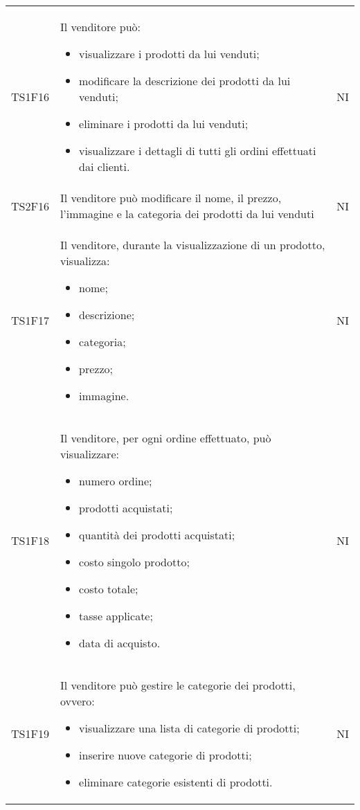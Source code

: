 {\begin{longtable}{C{3cm} C{10.2cm} C{1.5cm}}
TS1F16 & Il venditore può:
\begin{itemize}
	\item visualizzare i prodotti da lui venduti;
	\item modificare la descrizione dei prodotti da lui venduti;
	\item eliminare i prodotti da lui venduti;
	\item visualizzare i dettagli di tutti gli ordini effettuati dai clienti.
\end{itemize} & NI\\

TS2F16 & Il venditore può modificare il nome, il prezzo, l'immagine e la categoria dei prodotti da lui venduti & NI\\

TS1F17 & Il venditore, durante la visualizzazione di un prodotto, visualizza:
\begin{itemize}
	\item nome;
	\item descrizione;
	\item categoria;
	\item prezzo;
	\item immagine.
\end{itemize} & NI\\

TS1F18 & Il venditore, per ogni ordine effettuato, può visualizzare:
\begin{itemize}
	\item numero ordine;
	\item prodotti acquistati;
	\item quantità dei prodotti acquistati;
	\item costo singolo prodotto;
	\item costo totale;
	\item tasse applicate;
	\item data di acquisto.
\end{itemize}
& NI\\

TS1F19 & Il venditore può gestire le categorie dei prodotti, ovvero:
\begin{itemize}
	\item visualizzare una lista di categorie di prodotti;
	\item inserire nuove categorie di prodotti;
	\item eliminare categorie esistenti di prodotti.
\end{itemize}
& NI\\






\end{longtable}}
